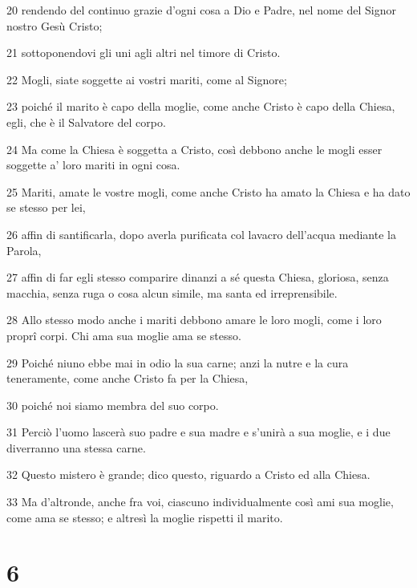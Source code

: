 \par 20 rendendo del continuo grazie d'ogni cosa a Dio e Padre, nel nome del Signor nostro Gesù Cristo;
\par 21 sottoponendovi gli uni agli altri nel timore di Cristo.
\par 22 Mogli, siate soggette ai vostri mariti, come al Signore;
\par 23 poiché il marito è capo della moglie, come anche Cristo è capo della Chiesa, egli, che è il Salvatore del corpo.
\par 24 Ma come la Chiesa è soggetta a Cristo, così debbono anche le mogli esser soggette a' loro mariti in ogni cosa.
\par 25 Mariti, amate le vostre mogli, come anche Cristo ha amato la Chiesa e ha dato se stesso per lei,
\par 26 affin di santificarla, dopo averla purificata col lavacro dell'acqua mediante la Parola,
\par 27 affin di far egli stesso comparire dinanzi a sé questa Chiesa, gloriosa, senza macchia, senza ruga o cosa alcun simile, ma santa ed irreprensibile.
\par 28 Allo stesso modo anche i mariti debbono amare le loro mogli, come i loro proprî corpi. Chi ama sua moglie ama se stesso.
\par 29 Poiché niuno ebbe mai in odio la sua carne; anzi la nutre e la cura teneramente, come anche Cristo fa per la Chiesa,
\par 30 poiché noi siamo membra del suo corpo.
\par 31 Perciò l'uomo lascerà suo padre e sua madre e s'unirà a sua moglie, e i due diverranno una stessa carne.
\par 32 Questo mistero è grande; dico questo, riguardo a Cristo ed alla Chiesa.
\par 33 Ma d'altronde, anche fra voi, ciascuno individualmente così ami sua moglie, come ama se stesso; e altresì la moglie rispetti il marito.

\chapter{6}

